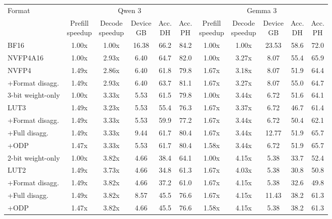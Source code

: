 \begin{tabular}{l|ccccc|ccccc}
\toprule
\multirow{2}{*}{Format} & \multicolumn{5}{c|}{Qwen 3} & \multicolumn{5}{c}{Gemma 3} \\
  & \makecell{Prefill\\speedup} & \makecell{Decode\\speedup} & \makecell{Device\\GB} & \makecell{Acc.\\DH} & \makecell{Acc.\\PH} & \makecell{Prefill\\speedup} & \makecell{Decode\\speedup} & \makecell{Device\\GB} & \makecell{Acc.\\DH} & \makecell{Acc.\\PH} \\ \midrule
BF16 & 1.00x & 1.00x & 16.38 & 66.2 & 84.2 & 1.00x & 1.00x & 23.53 & 58.6 & 72.0 \\\midrule
NVFP4A16 & 1.00x & 2.93x & 6.40 & 64.7 & 82.0 & 1.00x & 3.27x & 8.07 & 55.4 & 65.9 \\
NVFP4 & 1.49x & 2.86x & 6.40 & 61.8 & 79.8 & 1.67x & 3.18x & 8.07 & 51.9 & 64.4 \\
+Format disagg. & 1.49x & 2.93x & 6.40 & 63.7 & 81.1 & 1.67x & 3.27x & 8.07 & 55.0 & 64.7 \\\midrule
3-bit weight-only & 1.00x & 3.33x & 5.53 & 61.5 & 79.8 & 1.00x & 3.44x & 6.72 & 51.6 & 64.1 \\
LUT3 & 1.49x & 3.23x & 5.53 & 55.4 & 76.3 & 1.67x & 3.37x & 6.72 & 46.7 & 61.4 \\
+Format disagg. & 1.49x & 3.33x & 5.53 & 59.9 & 77.2 & 1.67x & 3.44x & 6.72 & 50.4 & 62.1 \\
+Full disagg. & 1.49x & 3.33x & 9.44 & 61.7 & 80.4 & 1.67x & 3.44x & 12.77 & 51.9 & 65.7 \\
+ODP & 1.47x & 3.33x & 5.53 & 61.7 & 80.4 & 1.58x & 3.44x & 6.72 & 51.9 & 65.7 \\\midrule
2-bit weight-only & 1.00x & 3.82x & 4.66 & 38.4 & 64.1 & 1.00x & 4.15x & 5.38 & 33.7 & 52.4 \\
LUT2 & 1.49x & 3.73x & 4.66 & 34.8 & 61.3 & 1.67x & 4.03x & 5.38 & 30.8 & 50.8 \\
+Format disagg. & 1.49x & 3.82x & 4.66 & 37.2 & 61.0 & 1.67x & 4.15x & 5.38 & 32.6 & 49.8 \\
+Full disagg. & 1.49x & 3.82x & 8.57 & 45.5 & 76.6 & 1.67x & 4.15x & 11.43 & 38.2 & 61.3 \\
+ODP & 1.47x & 3.82x & 4.66 & 45.5 & 76.6 & 1.58x & 4.15x & 5.38 & 38.2 & 61.3 \\
\bottomrule
\end{tabular}
